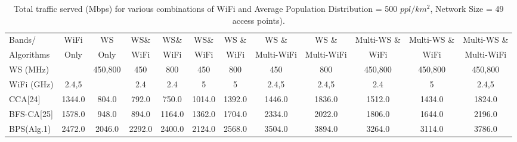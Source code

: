 \begin{table*}[hpt]	
\centering	
\begin{tabular}{|l|c|c|c|c|c|c|c|c|c|c|c|}	
\hline	
Bands/     & WiFi & WS    & WS\&   & WS\& & WS\& & WS \&  & WS \&      & WS \&        & Multi-WS \& & Multi-WS \& & Multi-WS \& \\	
Algorithms & Only & Only  & WiFi   & WiFi & WiFi & WiFi   & Multi-WiFi & Multi-WiFi   & WiFi        & WiFi        & Multi-WiFi  \\	
\hline	
WS (MHz)   &       & 450,800  & 450   & 800 & 450 & 800 & 450   & 800     & 450,800 &  450,800      & 450,800  \\	
\hline	
WiFi (GHz) & 2.4,5 &          & 2.4   & 2.4 & 5   & 5   & 2.4,5 & 2.4,5   & 2.4     &    5          & 2.4,5  \\	
\hline	
CCA[24]& 1344.0& 804.0& 792.0& 750.0& 1014.0& 1392.0& 1446.0& 1836.0& 1512.0& 1434.0& 1824.0\\	
\hline	
BFS-CA[25]& 1578.0& 948.0& 894.0& 1164.0& 1362.0& 1704.0& 2334.0& 2022.0& 1806.0& 1644.0& 2196.0\\	
\hline	
BPS(Alg.1)& 2472.0& 2046.0& 2292.0& 2400.0& 2124.0& 2568.0& 3504.0& 3894.0& 3264.0& 3114.0& 3786.0\\	
\hline	
\end{tabular}    
\caption{ Total traffic served (Mbps) for various combinations of WiFi and Average Population Distribution = 500 $ppl/km^2$, Network Size = 49 access points).} %
\label{tab:2channelcombination}    
\vspace{-0.4in}
\end{table*}    
